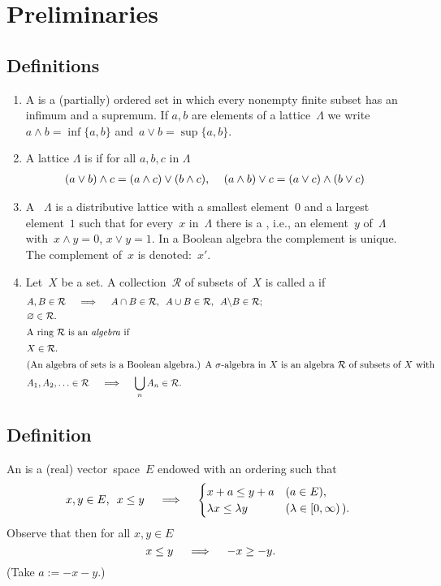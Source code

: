 \documentclass[main.tex]{subfiles}
\begin{document}
\chapter{Preliminaries}
%
\section{Definitions}
\begin{enumerate}
\item 
A  is a (partially) ordered set in which
every nonempty finite subset has an infimum and a supremum. 
If $a,b$ are elements of a lattice~$\Lambda$ 
we write~$a\wedge b = \inf\{a,b\}$
and~$a\vee b = \sup\{a,b\}$.
\item 
A lattice $\Lambda$ is 
if for all $a,b,c$ in $\Lambda$
\begin{align*}
(a\vee b)\wedge c &= (a\wedge c)\vee (b\wedge c)\textnormal{, } &
(a\wedge b)\vee c &= (a\vee c) \wedge (b\vee c) 
\end{align*}
\item 
A ~$\Lambda$ is a distributive lattice
with a smallest element~$0$
and a largest element~$1$
such that for every~$x$ in~$\Lambda$
there is a ,
i.e., 
an element~$y$ of~$\Lambda$
with~$x\wedge y=0$, $x\vee y=1$.
In a Boolean algebra the complement is unique.
The complement of~$x$ is denoted:~$x'$.
\item 
Let~$X$ be a set.
A collection~$\mathcal{R}$ 
of subsets of~$X$
is called a  if
\begin{align*}
&A,B\in\mathcal{R} \quad \implies \quad 
  A\cap B \in \mathcal{R}\htam{, }\ 
  A\cup B \in \mathcal{R}\htam{, }\ 
  A\backslash B \in \mathcal{R}\htam{; } \\
&\varnothing \in \mathcal{R} 
\htam{.} \\
\intertext{%
A ring~$\mathcal{R}$ is an \keyword{algebra} if%
}
&X \in \mathcal{R}
\htam{.} \\
\intertext{%
(An algebra of sets is a Boolean algebra.) 
A $\sigma$-algebra in~$X$
is an algebra~$\mathcal{R}$
of subsets of~$X$
with%
}
& A_1, A_2, \ldots \in \mathcal{R}\quad \implies\quad 
  \bigcup_n A_n \in \mathcal{R}
\htam{.}
\end{align*}
\end{enumerate}
%
%
%
%
\section{Definition}
An  
is a (real) vector~space~$E$
endowed with an ordering such that
\begin{equation*}
x,y\in E\textnormal{, }\ x\leq y
 \quad \implies \quad
\begin{cases}
x+a \leq y+a  
  & (a\in E)\textnormal{, } \\
\lambda x \leq \lambda y 
  & (\lambda \in [0,\infty)\,)\textnormal{. }
\end{cases}
\end{equation*}
Observe that then for all $x,y\in E$
\begin{equation*}
x\leq y \quad \implies \quad -x \geq -y\textnormal{.}
\end{equation*}
(Take $a:=-x-y$.)
%
%
%
\end{document}
